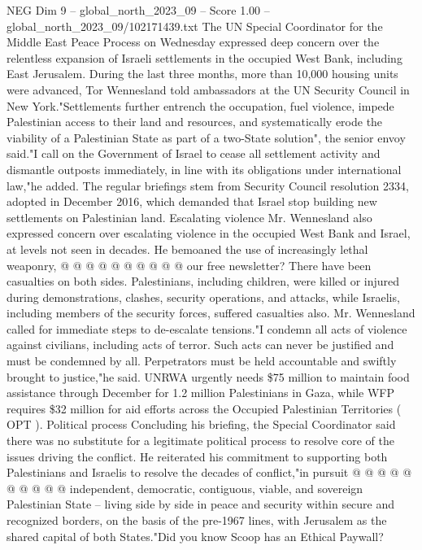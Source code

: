 \begin{textsample}{NEG Dim 9 – global\_north\_2023\_09 – Score 1.00 – global\_north\_2023\_09/102171439.txt}  \label{ex:f9_neg_439}
The UN Special Coordinator for the Middle East Peace Process on Wednesday expressed deep concern over the relentless expansion of Israeli settlements in the occupied West Bank, including East Jerusalem.
During the last three months, more than 10,000 housing units were advanced, Tor Wennesland told ambassadors at the UN Security Council in New York."Settlements further entrench the occupation, fuel violence, impede Palestinian access to their land and resources, and systematically erode the viability of a Palestinian State as part of a two-State solution", the senior envoy said."I call on the Government of Israel to cease all settlement activity and dismantle outposts immediately, in line with its obligations under international law,"he added.
The regular briefings stem from Security Council resolution 2334, adopted in December 2016, which demanded that Israel stop building new settlements on Palestinian land.
Escalating violence Mr.
Wennesland also expressed concern over escalating violence in the occupied West Bank and Israel, at levels not seen in decades.
He bemoaned the use of increasingly lethal weaponry, @ @ @ @ @ @ @ @ @ @ our free newsletter?
There have been casualties on both sides.
Palestinians, including children, were killed or injured during demonstrations, clashes, security operations, and attacks, while Israelis, including members of the security forces, suffered casualties also.
Mr.
Wennesland called for immediate steps to de-escalate tensions."I condemn all acts of violence against civilians, including acts of terror.
Such acts can never be justified and must be condemned by all.
Perpetrators must be held accountable and swiftly brought to justice,"he said.
UNRWA urgently needs \$75 million to maintain food assistance through December for 1.2 million Palestinians in Gaza, while WFP requires \$32 million for aid efforts across the Occupied Palestinian Territories ( OPT ).
Political process Concluding his briefing, the Special Coordinator said there was no substitute for a legitimate political process to resolve core of the issues driving the conflict.
He reiterated his commitment to supporting both Palestinians and Israelis to resolve the decades of conflict,"in pursuit @ @ @ @ @ @ @ @ @ @ independent, democratic, contiguous, viable, and sovereign Palestinian State -- living side by side in peace and security within secure and recognized borders, on the basis of the pre-1967 lines, with Jerusalem as the shared capital of both States."Did you know Scoop has an Ethical Paywall?

\end{textsample}
